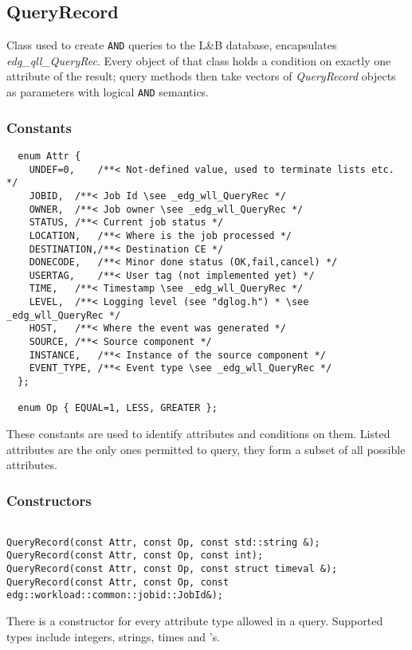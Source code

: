 \documentclass{egee}
\def\LB{L\&B\xspace}
\begin{document}
\subsection*{QueryRecord}
Class used to create \verb|AND| queries to the \LB
database, encapsulates \emph{edg\_qll\_QueryRec}. Every object of that
class holds a condition on exactly one attribute of the result; query
methods then take vectors of \emph{QueryRecord} objects as parameters
with logical \verb|AND| semantics. 

\subsubsection*{Constants}
\begin{description}
\item{
\begin{verbatim}
  enum Attr {
    UNDEF=0,	/**< Not-defined value, used to terminate lists etc. */
    JOBID,	/**< Job Id \see _edg_wll_QueryRec */
    OWNER,	/**< Job owner \see _edg_wll_QueryRec */
    STATUS,	/**< Current job status */
    LOCATION,	/**< Where is the job processed */
    DESTINATION,/**< Destination CE */
    DONECODE,	/**< Minor done status (OK,fail,cancel) */
    USERTAG,	/**< User tag (not implemented yet) */
    TIME,	/**< Timestamp \see _edg_wll_QueryRec */
    LEVEL,	/**< Logging level (see "dglog.h") * \see _edg_wll_QueryRec */
    HOST,	/**< Where the event was generated */
    SOURCE,	/**< Source component */
    INSTANCE,	/**< Instance of the source component */
    EVENT_TYPE,	/**< Event type \see _edg_wll_QueryRec */
  };

  enum Op { EQUAL=1, LESS, GREATER };
\end{verbatim}
 These constants are used to identify attributes and conditions on
them. Listed attributes are the only ones permitted to query, they
form a subset of all possible attributes.
}
\end{description}

\subsubsection*{Constructors}
\begin{description}
\item{
\begin{verbatim}

QueryRecord(const Attr, const Op, const std::string &);
QueryRecord(const Attr, const Op, const int);
QueryRecord(const Attr, const Op, const struct timeval &);
QueryRecord(const Attr, const Op, const edg::workload::common::jobid::JobId&);
\end{verbatim}
}
There is a constructor for every attribute type allowed in a
query. Supported types include integers, strings, times and \jobid's.

\end{description}
\end{document}
